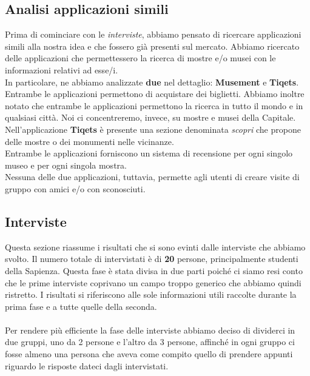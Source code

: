\def\people{20}

\subsection{Analisi applicazioni simili}
Prima di cominciare con le \textit{interviste}, abbiamo pensato di ricercare applicazioni simili alla nostra idea e che fossero già presenti sul mercato.
Abbiamo ricercato delle applicazioni che permettessero la ricerca di mostre e/o musei con le informazioni relativi ad esse/i. \\
In particolare, ne abbiamo analizzate \textbf{due} nel dettaglio: \textbf{Musement} e \textbf{Tiqets}.
Entrambe le applicazioni permettono di acquistare dei biglietti.  Abbiamo inoltre notato che entrambe le applicazioni permettono la ricerca in tutto il mondo e in qualsiasi città. Noi ci concentreremo, invece, su mostre e musei della Capitale.
Nell'applicazione \textbf{Tiqets} è presente una sezione denominata \textit{scopri} che propone delle mostre o dei monumenti nelle vicinanze. \\
Entrambe le applicazioni forniscono un sistema di recensione per ogni singolo museo e per ogni singola mostra.\\
Nessuna delle due applicazioni, tuttavia, permette agli utenti di creare visite di gruppo con amici e/o con sconosciuti.


\subsection{Interviste}

Questa sezione riassume i risultati che si sono evinti dalle interviste che abbiamo svolto. Il numero totale di intervistati è di \textbf{\people} persone, principalmente studenti della Sapienza. Questa fase è stata divisa in due parti poiché ci siamo resi conto che le prime interviste coprivano un campo troppo generico che abbiamo quindi ristretto. I risultati si riferiscono alle sole informazioni utili raccolte durante la prima fase e a tutte quelle della seconda.

\paragraph{}
Per rendere più efficiente la fase delle interviste abbiamo deciso di dividerci in due gruppi, uno da 2 persone e l'altro da 3 persone, affinché in ogni gruppo ci fosse almeno una persona che aveva come compito quello di prendere appunti riguardo le risposte dateci dagli intervistati.


